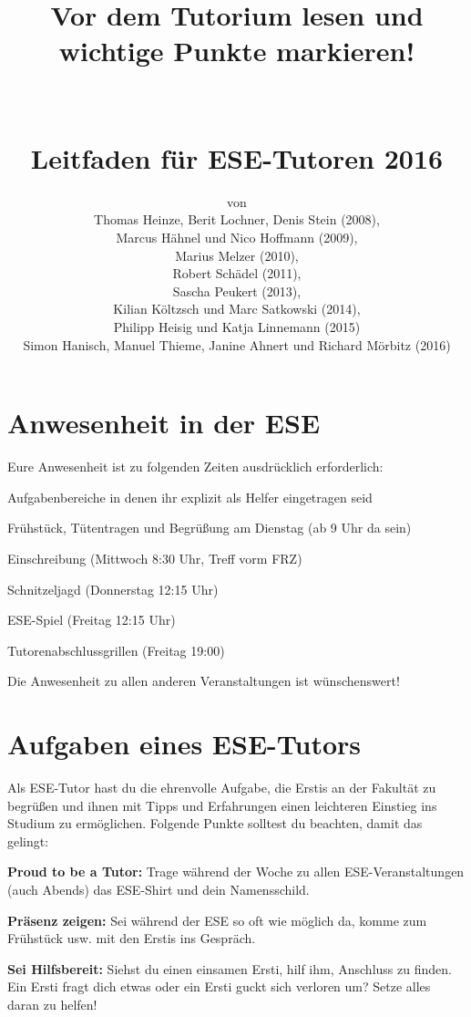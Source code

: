 \documentclass[a4paper,12pt]{report}
\begin{document}
\title{\huge{\textbf{Vor dem Tutorium lesen und wichtige Punkte markieren!}}\\\ \\\ \\{Leitfaden für ESE-Tutoren 2016}}
\date{}
\author{von\\Thomas Heinze, Berit Lochner, Denis Stein (2008), \\Marcus Hähnel und Nico Hoffmann (2009), \\Marius Melzer (2010), \\Robert Schädel (2011),\\Sascha Peukert (2013), \\Kilian Költzsch und Marc Satkowski (2014), \\Philipp Heisig und Katja Linnemann (2015) \\Simon Hanisch, Manuel Thieme, Janine Ahnert und Richard Mörbitz (2016)}
\maketitle

\section*{Anwesenheit in der ESE}
Eure Anwesenheit ist zu folgenden Zeiten ausdrücklich erforderlich:
\begin{itemize*}
	\item Aufgabenbereiche in denen ihr explizit als Helfer eingetragen seid
	\item Frühstück, Tütentragen und Begrüßung am Dienstag (ab 9 Uhr da sein)
	\item Einschreibung (Mittwoch 8:30 Uhr, Treff vorm FRZ)
	\item Schnitzeljagd (Donnerstag 12:15 Uhr)
	\item ESE-Spiel (Freitag 12:15 Uhr)
	\item Tutorenabschlussgrillen (Freitag 19:00)
\end{itemize*}
Die Anwesenheit zu allen anderen Veranstaltungen ist wünschenswert!

\section*{Aufgaben eines ESE-Tutors}
Als ESE-Tutor hast du die ehrenvolle Aufgabe, die Erstis an der Fakultät zu begrüßen und ihnen mit Tipps und Erfahrungen einen leichteren Einstieg ins Studium zu ermöglichen. Folgende Punkte solltest du beachten, damit das gelingt:
\begin{itemize*}
	\item \textbf{Proud to be a Tutor:} Trage während der Woche zu allen ESE-Veranstaltungen (auch Abends) das ESE-Shirt und dein Namensschild.
	\item \textbf{Präsenz zeigen:} Sei während der ESE so oft wie möglich da, komme zum Frühstück usw. mit den Erstis ins Gespräch.
	\item \textbf{Sei Hilfsbereit:} Siehst du einen einsamen Ersti, hilf ihm, Anschluss zu finden. Ein Ersti fragt dich etwas oder ein Ersti guckt sich verloren um? Setze alles daran zu helfen!
\end{itemize*}
\end{document}
